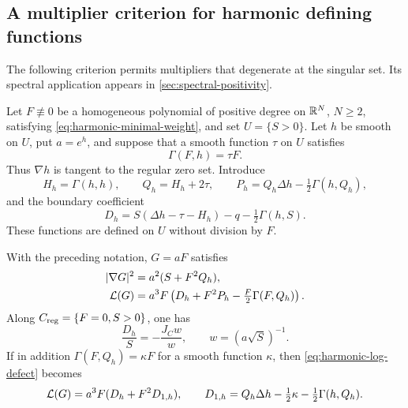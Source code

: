 \subsection{A multiplier criterion for harmonic defining functions}
\label{sec:harmonic-multiplier-criterion}

The following criterion permits multipliers that degenerate at the
singular set. Its spectral application appears in
\cref{sec:spectral-positivity}.

Let \(F\not\equiv0\) be a homogeneous polynomial of positive degree on
\(\mathbb R^N\), \(N\ge2\), satisfying \eqref{eq:harmonic-minimal-weight}, and set
\(U=\{S>0\}\).  Let \(h\) be smooth on \(U\), put \(a=e^h\),
and suppose that a smooth function \(\tau\) on \(U\) satisfies
\begin{equation}\label{eq:harmonic-log-compatibility}
 \Gamma(F,h)=\tau F.
\end{equation}
Thus \(\nabla h\) is tangent to the regular zero set. Introduce
\begin{equation}\label{eq:harmonic-log-auxiliary}
 H_h=\Gamma(h,h),\qquad Q_h=H_h+2\tau,\qquad
 P_h=Q_h\Delta h-\tfrac12\Gamma(h,Q_h),
\end{equation}
and the boundary coefficient
\begin{equation}\label{eq:harmonic-log-D0}
 D_h=S(\Delta h-\tau-H_h)-q-\tfrac12\Gamma(h,S).
\end{equation}
These functions are defined on \(U\) without division by \(F\).

\begin{lemma}
\label{lem:harmonic-log-multiplier}
With the preceding notation, \(G=aF\) satisfies
\begin{align}
 |\nabla G|^2&=a^2(S+F^2Q_h),
 \label{eq:harmonic-log-gradient}\\
 \mathcal L(G)&=a^3F\left(D_h+F^2P_h-
                    \tfrac F2\Gamma(F,Q_h)\right).
 \label{eq:harmonic-log-defect}
\end{align}
Along \(C_{\mathrm{reg}}=\{F=0,S>0\}\), one has
\begin{equation}\label{eq:harmonic-log-Jacobi}
 \frac{D_h}{S}=-\frac{J_Cw}{w},\qquad
 w=(a\sqrt S)^{-1}.
\end{equation}
If in addition \(\Gamma(F,Q_h)=\kappa F\) for a smooth function
\(\kappa\), then \eqref{eq:harmonic-log-defect} becomes
\begin{equation}\label{eq:harmonic-log-two-coefficients}
 \mathcal L(G)=a^3F(D_h+F^2D_{1,h}),\qquad
 D_{1,h}=Q_h\Delta h-\tfrac12\kappa-
                         \tfrac12\Gamma(h,Q_h).
\end{equation}
\end{lemma}

